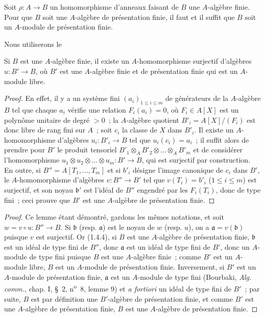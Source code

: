 \begin{proposition}[1.4.7]
\label{IV.1.4.7-fr}
Soit $\rho:A\to B$ un homomorphisme d'anneaux faisant de $B$ une $A$-algèbre
finie. Pour que $B$ soit une $A$-algèbre de présentation finie, il faut et il
suffit que $B$ soit un $A$-module de présentation finie.
\end{proposition}

Nous utiliserons le

\begin{lemma}[1.4.7.1]
\label{IV.1.4.7.1-fr}
Si $B$ est une $A$-algèbre finie, il existe un $A$-homomorphisme surjectif
d'algèbres $u:B'\to B$, où $B'$ est une $A$-algèbre finie et de présentation
finie qui est un $A$-module libre.
\end{lemma}

\begin{proof}
En effet, il y a un système fini $(a_i)_{1\leq i\leq m}$ de générateurs de la
$A$-algèbre $B$ tel que chaque $a_i$ vérifie une relation $F_i(a_i)=0$, où
$F_i\in A[X]$ est un polynôme unitaire de degré $>0$~; la $A$-algèbre quotient
$B'_i=A[X]/(F_i)$ est donc libre de rang fini sur $A$~; soit $c_i$ la classe de
$X$ dans $B'_i$. Il existe un $A$-homomorphisme d'algèbres $u_i:B'_i\to B$
tel que $u_i(c_i)=a_i$~; il suffit alors de prendre pour $B'$ le produit
tensoriel $B'_1\otimes_AB'_2\otimes\ldots\otimes_AB'_m$ et de considérer
l'homomorphisme $u_1\otimes u_2\otimes\ldots\otimes u_m:B'\to B$, qui est
surjectif par construction. En outre, si $B''=A[T_1,\ldots,T_m]$ et si $b'_i$
désigne l'image canonique de $c_i$ dans $B'$, le $A$-homomorphisme d'algèbres
$v:B''\to B'$ tel que $v(T_i)=b'_i$ ($1\leq i\leq m$) est surjectif, et son
noyau $\mathfrak b'$ est l'idéal de $B''$ engendré par les $F_i(T_i)$, donc de
type fini~; ceci prouve que $B'$ est une $A$-algèbre de présentation finie.
\end{proof}

\begin{proof}
Ce lemme étant démontré, gardons les mêmes notations, et soit
$w=v\circ u:B''\to B$. Si $\mathfrak b$ (resp. $\mathfrak a$) est le noyau de
$w$ (resp. $u$), on a $\mathfrak a=v(\mathfrak b)$ puisque $v$ est surjectif.
Or (1.4.4), si $B$ est une $A$-algèbre de présentation finie, $\mathfrak b$
est un idéal de type fini de $B''$, donc $\mathfrak a$ est un idéal de type
fini de $B'$, donc un $A$-module de type fini puisque $B$ est une $A$-algèbre
finie~; comme $B'$ est un $A$-module libre, $B$ est un $A$-module de
présentation finie. Inversement, si $B'$ est un $A$-module de présentation
finie, $\mathfrak a$ est un $A$-module de type fini (Bourbaki,
\emph{Alg. comm.}, chap. I, \S~2, n\textsuperscript{o}~8, lemme 9) et
\emph{a fortiori} un idéal de type fini de $B'$~; par suite, $B$ est par
définition une $B'$-algèbre de présentation finie, et comme $B'$ est une
$A$-algèbre de présentation finie, $B$ est une $A$-algèbre de présentation
finie.
\end{proof}

